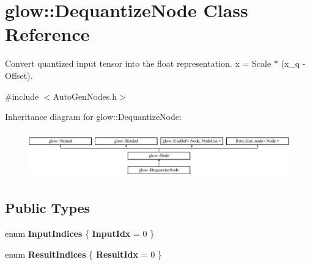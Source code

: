 \hypertarget{classglow_1_1_dequantize_node}{}\section{glow\+:\+:Dequantize\+Node Class Reference}
\label{classglow_1_1_dequantize_node}


Convert quantized input tensor into the float representation. x = Scale $\ast$ (x\+\_\+q -\/ Offset).  




{\ttfamily \#include $<$Auto\+Gen\+Nodes.\+h$>$}

Inheritance diagram for glow\+:\+:Dequantize\+Node\+:\begin{figure}[H]
\begin{center}
\leavevmode
\includegraphics[height=2.028986cm]{classglow_1_1_dequantize_node}
\end{center}
\end{figure}
\subsection*{Public Types}
\begin{DoxyCompactItemize}
\item 
\mbox{\label{classglow_1_1_dequantize_node_aefb748b6bb6736c9e2f37f45b2cd0242}} 
enum {\bfseries Input\+Indices} \{ {\bfseries Input\+Idx} = 0
 \}
\item 
\mbox{\label{classglow_1_1_dequantize_node_a502be9c6af0c9a73e785224059b1402c}} 
enum {\bfseries Result\+Indices} \{ {\bfseries Result\+Idx} = 0
 \}
\end{DoxyCompactItemize}
